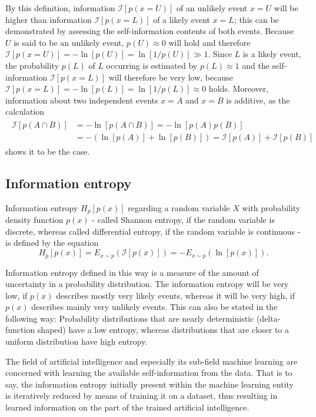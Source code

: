 \documentclass[a4paper,12pt]{report}
\begin{document}
By this definition, information $\mathcal{I}[p(x=U)]$ of an unlikely event $x=U$ will be higher than information $\mathcal{I}[p(x=L)]$ of a likely event $x = L$; this can be demonstrated by assessing the self-information contents of both events. Because $U$ is said to be an unlikely event, $p(U) \approx 0$ will hold and therefore $\mathcal{I}[p(x=U)] = -\ln[p(U)] = \ln[1/p(U)] \gg 1$. Since $L$ is a likely event, the probability $p(L)$ of $L$ occurring is estimated by $p(L) \approx 1$ and the self-information $\mathcal{I}[p(x=L)]$ will therefore be very low, because $\mathcal{I}[p(x=L)] = -\ln[p(L)] = \ln[1/p(L)] \approx 0$ holds. Moreover, information about two independent events $x=A$ and $x=B$ is additive, as the calculation
\begin{align}
\begin{aligned} \mathcal{I}[p(A\cap B)] &= -\ln[p(A\cap B)] = -\ln[p(A)p(B)] \\ &= -(\ln[p(A)] + \ln[p(B)]) = \mathcal{I}[p(A)] + \mathcal{I}[p(B)]
\end{aligned}
\end{align} shows it to be the case.

\subsection{Information entropy}
Information entropy $H_p[p(x)]$ regarding a random variable $X$ with probability density function $p(x)$ - called Shannon entropy, if the random variable is discrete, whereas called differential entropy, if the random variable is continuous - is defined by the equation \begin{equation}
H_p[p(x)] = E_{x\sim p}(\mathcal{I}[p(x)]) = -E_{x\sim p}\left(\ln[p(x)]\right).
\end{equation} %

Information entropy defined in this way is a measure of the amount of uncertainty in a probability distribution. The information entropy will be very low, if $p(x)$ describes mostly very likely events, whereas it will be very high, if $p(x)$ describes mainly very unlikely events. This can also be stated in the following way: Probability distributions that are nearly deterministic (delta-function shaped) have a low entropy, whereas distributions that are closer to a uniform distribution have high entropy.

The field of artificial intelligence and especially its sub-field machine learning are concerned with learning the available self-information from the data. That is to say, the information entropy initially present within the machine learning entity is iteratively reduced by means of training it on a dataset, thus resulting in learned information on the part of the trained artificial intelligence.
\end{document}
